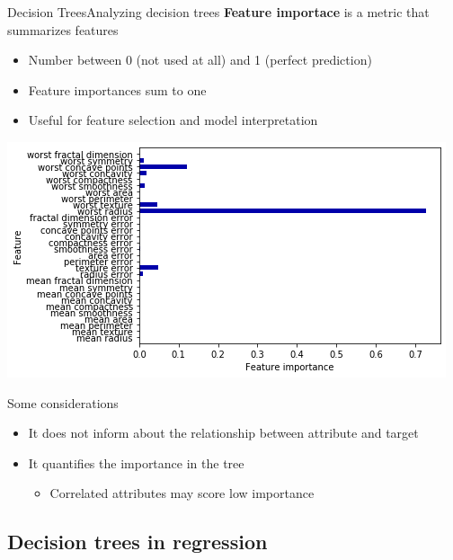 \documentclass[10pt,compress]{beamer} %
\begin{document}
\begin{frame}{Decision Trees}{Analyzing decision trees}
    \textbf{Feature importace} is a metric that summarizes features
    \begin{itemize}
        \item Number between 0 (not used at all) and 1 (perfect prediction)
        \item Feature importances sum to one
        \item Useful for feature selection and model interpretation
    \end{itemize}

   \centering \includegraphics[width=0.5\linewidth]{figs/tree-importance.png}

   \flushleft

   \vspace{-0.5cm}

   Some considerations
   \begin{itemize}
       \item It does not inform about the relationship between attribute and target
       \item It quantifies the importance in the tree
       \begin{itemize} 
            \item Correlated attributes may score low importance
       \end{itemize}
   \end{itemize}

\end{frame}

\subsection{Decision trees in regression}
\end{document}
